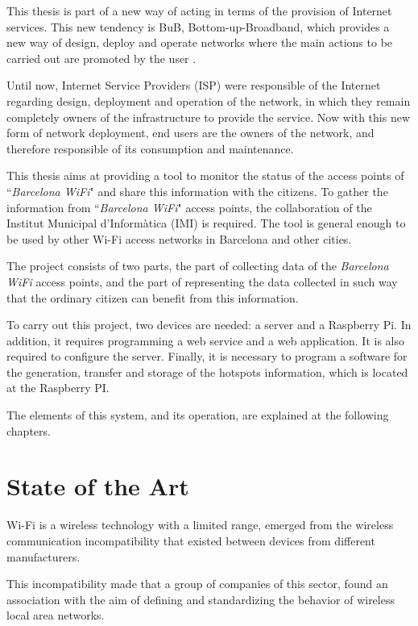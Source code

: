 \documentclass[12pt, a4paper,twoside]{tesi_upf}
\begin{document}
This thesis is part of a new way of acting in terms of the provision of Internet services. This new tendency is BuB, Bottom-up-Broadband, which provides a new way of design, deploy and operate networks where the main actions to be carried out are promoted by the user \cite{bubu}.

Until now, Internet Service Providers (ISP) were responsible of the Internet regarding design, deployment and operation of the network, in which they remain completely owners of the infrastructure to provide the service. Now with this new form of network deployment, end users are the owners of the network, and therefore responsible of its consumption and maintenance.

This thesis aims at providing a tool to monitor the status of the access points of ``\emph{Barcelona WiFi}" and share this information with the citizens. To gather the information from ``\emph{Barcelona WiFi}" access points, the collaboration of the Institut Municipal d'Informàtica (IMI) is required. The tool is general enough to be used by other Wi-Fi access networks in Barcelona and other cities.


The project consists of two parts, the part of collecting data of the \emph{Barcelona WiFi} access points, and the part of representing the data collected in such way that the ordinary citizen can benefit from this information. 

To carry out this project, two devices are needed: a server and a Raspberry Pi. In addition, it requires programming a web service and a web application. It is also required to configure the server. Finally, it is necessary to program a software for the generation, transfer and storage of the hotspots information, which is located at the Raspberry PI.

The elements of this system, and its operation, are explained at the following chapters.
  
\chapter{State of the Art}
\label{Chapter2}

Wi-Fi is a wireless technology with a limited range, emerged from the wireless communication incompatibility that existed between devices from different manufacturers.

This incompatibility made that a group of companies of this sector, found an association with the aim of defining and standardizing the behavior of wireless local area networks.
\end{document}
